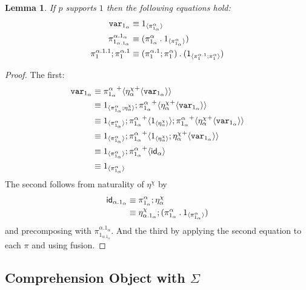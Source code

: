 \documentclass[10pt]{article}
\newtheorem{lemma}{Lemma}
\theoremstyle{definition}
\newcommand{\id}{\mathsf{id}}
\newcommand\bdot[0]{\mathbin{.}}
\newcommand\ApPlus[2]{\ensuremath{{#1}^+ \langle #2 \rangle }}
\begin{document}
\begin{lemma}
If $p$ supports $1$ then the following equations hold:
\begin{align}
\var{1_\alpha} &\equiv \ApOne{\pi^\alpha_{1_\alpha}} \\
\pi^{\alpha.1_\alpha}_{1_{\alpha.1_\alpha}} &\equiv (\pi^\alpha_{1_\alpha} \bdot \ApOne{\pi^\alpha_{1_\alpha}}) \\
\pi^{\alpha.1.1}_1;\pi^{\alpha.1}_1 &\equiv (\pi^{\alpha.1}_1;\pi^{\alpha}_1) \bdot (\ApOne{\pi^{\alpha.1}_1;\pi^{\alpha}_1})
\end{align}
\end{lemma}
\begin{proof}
The first:
\begin{align*}
\var{1_\alpha} 
&\equiv \ApPlus{\pi^\alpha_{1_\alpha}}{\ApPlus{\eta^\chi_\alpha}{\var{1_\alpha}}} \\
&\equiv \ApOne{\pi^\alpha_{1_\alpha} ; \eta^\chi_\alpha};\ApPlus{\pi^\alpha_{1_\alpha}}{\ApPlus{\eta^\chi_\alpha}{\var{1_\alpha}}} \\
&\equiv \ApOne{\pi^\alpha_{1_\alpha}};\ApPlus{\pi^\alpha_{1_\alpha}}{\ApOne{\eta^\chi_\alpha}};\ApPlus{\pi^\alpha_{1_\alpha}}{\ApPlus{\eta^\chi_\alpha}{\var{1_\alpha}}} \\
&\equiv \ApOne{\pi^\alpha_{1_\alpha}};\ApPlus{\pi^\alpha_{1_\alpha}}{\ApOne{\eta^\chi_\alpha};\ApPlus{\eta^\chi_\alpha}{\var{1_\alpha}}} \\
&\equiv \ApOne{\pi^\alpha_{1_\alpha}};\ApPlus{\pi^\alpha_{1_\alpha}}{\id_{\alpha}} \\
&\equiv \ApOne{\pi^\alpha_{1_\alpha}}
\end{align*}
The second follows from naturality of $\eta^\chi$ by
\begin{align*}
\id_{\alpha.1_\alpha} 
&\equiv \pi^\alpha_{1_\alpha} ; \eta^\chi_\alpha \\
&\equiv \eta^\chi_{\alpha.1_\alpha} ; (\pi^\alpha_{1_\alpha} \bdot \ApOne{\pi^\alpha_{1_\alpha}})
\end{align*}
and precomposing with $\pi^{\alpha.1_\alpha}_{1_{\alpha.1_\alpha}}$.
And the third by applying the second equation to each $\pi$ and using fusion.
\end{proof}

\subsection{Comprehension Object with $\Sigma$}
\newcommand\mtt[1]{\mathtt{#1}}
\newcommand\contract[1]{\ensuremath{\mathtt{contract}_{#1}}}
\newcommand\fibpair[1]{\ensuremath{\mathtt{fibpair}_{#1}}}
\newcommand\pair[1]{\ensuremath{\mathtt{pair}_{#1}}}
\newcommand\tsplit[1]{\ensuremath{\mathtt{split}_{#1}}}
  
\end{document}
